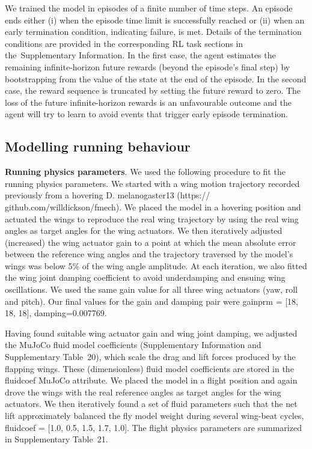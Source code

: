 \documentclass[sn-mathphys-num]{sn-jnl}%
\theoremstyle{thmstyleone}%
\theoremstyle{thmstyletwo}%
\theoremstyle{thmstylethree}%
\begin{document}
We trained the model in episodes of a finite number of time steps. 
An episode ends either (i) when the episode time limit is successfully reached or (ii) when an early termination condition, indicating failure, is met. 
Details of the termination conditions are provided in the corresponding RL task sections in the Supplementary Information. 
In the first case, the agent estimates the remaining infinite-horizon future rewards (beyond the episode’s final step) by bootstrapping from the value of the state at the end of the episode. 
In the second case, the reward sequence is truncated by setting the future reward to zero. 
The loss of the future infinite-horizon rewards is an unfavourable outcome and the agent will try to learn to avoid events that trigger early episode termination.


\subsection{Modelling running behaviour}

\textbf{Running physics parameters}. 
We used the following procedure to fit the running physics parameters. 
We started with a wing motion trajectory recorded previously from a hovering D. melanogaster13 (https:// github.com/willdickson/fmech). 
We placed the model in a hovering position and actuated the wings to reproduce the real wing trajectory by using the real wing angles as target angles for the wing actuators. 
We then iteratively adjusted (increased) the wing actuator gain to a point at which the mean absolute error between the reference wing angles and the trajectory traversed by the model’s wings was below 5\% of the wing angle amplitude. 
At each iteration, we also fitted the wing joint damping coefficient to avoid underdamping and ensuing wing oscillations. 
We used the same gain value for all three wing actuators (yaw, roll and pitch).
Our final values for the gain and damping pair were gainprm = [18, 18, 18], damping=0.007769. 


Having found suitable wing actuator gain and wing joint damping, we adjusted the MuJoCo fluid model coefficients (Supplementary Information and Supplementary Table 20), which scale the drag and lift forces produced by the flapping wings. 
These (dimensionless) fluid model coefficients are stored in the fluidcoef MuJoCo attribute. 
We placed the model in a flight position and again drove the wings with the real reference angles as target angles for the wing actuators. 
We then iteratively found a set of fluid parameters such that the net lift approximately balanced the fly model weight during several wing-beat cycles, fluidcoef = [1.0, 0.5, 1.5, 1.7, 1.0].
The flight physics parameters are summarized in Supplementary Table 21.
\end{document}
